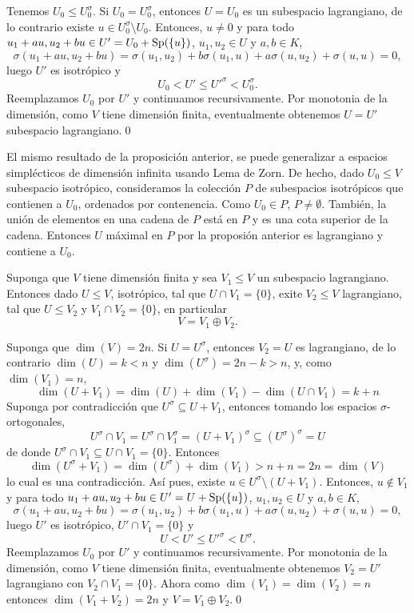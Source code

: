 \dem Tenemos $U_0\le U_0^\sigma$. Si $U_0=U_0^\sigma$, entonces $U=U_0$ es un subespacio lagrangiano, de lo contrario existe $u\in U_0^\sigma\setminus U_0$. Entonces, $u\ne 0$ y para todo $u_1+au,u_2+bu\in U'=U_0+\operatorname{Sp}(\{u\})$, $u_1,u_2\in U$ y $a,b\in K$,
\[
\sigma(u_1+au,u_2+bu)=\sigma(u_1,u_2)+b\sigma(u_1,u)+a\sigma(u,u_2)+\sigma(u,u)=0,
\]
luego $U'$ es isotr\'opico y 
\[
U_0<U'\le U'^\sigma<U_0^\sigma.
\]
Reemplazamos $U_0$ por $U'$ y continuamos recursivamente. Por monotonia de la dimensi\'on, como $V$ tiene dimensi\'on finita, eventualmente obtenemos $U=U'$ subespacio lagrangiano.\qed

\begin{obs}
El mismo resultado de la proposici\'on anterior, se puede generalizar a espacios simpl\'ecticos de dimensi\'on infinita usando Lema de Zorn. De hecho, dado $U_0\le V$ subespacio isotr\'opico,  consideramos la colecci\'on $P$ de subespacios isotr\'opicos que contienen a $U_0$, ordenados por contenencia. Como $U_0\in P$, $P\ne\emptyset$. Tambi\'en, la uni\'on de elementos en una cadena de $P$ est\'a en $P$ y es una cota superior de la cadena. Entonces $U$ m\'aximal en $P$ por la proposi\'on anterior es lagrangiano y contiene a $U_0$.
\end{obs}

\begin{prop}
Suponga que $V$ tiene dimensi\'on finita y sea $V_1\le V$ un subespacio lagrangiano. Entonces dado $U\le V$, isotr\'opico, tal que $U\cap V_1=\{0\}$, exite $V_2\le V$ lagrangiano, tal que $U\le V_2$ y $V_1\cap V_2=\{0\}$, en particular
\[
V=V_1\oplus V_2.
\]
\end{prop}

\dem Suponga que $\dim(V)=2n$. Si $U=U^\sigma$, entonces $V_2=U$ es lagrangiano, de lo contrario $\dim(U)=k<n$ y $\dim(U^\sigma)=2n-k>n$, y, como $\dim(V_1)=n$,
\[
\dim(U+V_1)=\dim(U)+\dim(V_1)-\dim(U\cap V_1)=k+n
\]
Suponga por contradicci\'on que $U^\sigma\subseteq U+V_1$, entonces tomando los espacios $\sigma$-ortogonales,
\[
U^\sigma\cap V_1=U^\sigma\cap V_1^\sigma=(U+V_1)^\sigma\subseteq \left(U^\sigma\right)^\sigma=U
\]
de donde $U^\sigma\cap V_1\subseteq U\cap V_1=\{0\}$. Entonces
\[
\dim(U^\sigma+V_1)=\dim(U^\sigma)+\dim(V_1)>n+n=2n=\dim(V)
\]
lo cual es una contradicci\'on. As\'i pues, existe $u\in U^\sigma\setminus (U+V_1)$. Entonces, $u\not\in V_1$ y para todo $u_1+au,u_2+bu\in U'=U+\operatorname{Sp}(\{u\})$, $u_1,u_2\in U$ y $a,b\in K$,
\[
\sigma(u_1+au,u_2+bu)=\sigma(u_1,u_2)+b\sigma(u_1,u)+a\sigma(u,u_2)+\sigma(u,u)=0,
\]
luego $U'$ es isotr\'opico, $U'\cap V_1=\{0\}$ y 
\[
U<U'\le U'^\sigma<U^\sigma.
\]
Reemplazamos $U_0$ por $U'$ y continuamos recursivamente. Por monotonia de la dimensi\'on, como $V$ tiene dimensi\'on finita, eventualmente obtenemos $V_2=U'$ lagrangiano con $V_2\cap V_1=\{0\}$. Ahora como $\dim(V_1)=\dim(V_2)=n$ entonces $\dim(V_1+V_2)=2n$ y $V=V_1\oplus V_2$.\qed


